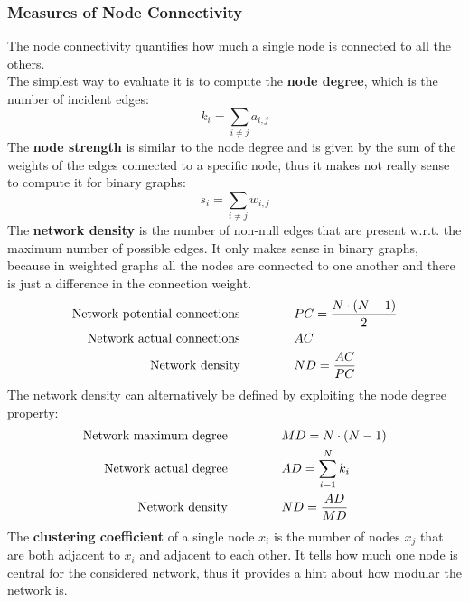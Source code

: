 \subsubsection{Measures of Node Connectivity}
The node connectivity quantifies how much a single node is connected to all the others.\\
The simplest way to evaluate it is to compute the \textbf{node degree}, which is the number of incident edges:
\begin{equation*}
    k_i=\sum_{i\neq{j}}{a_{i,j}}
\end{equation*}
The \textbf{node strength} is similar to the node degree and is given by the sum of the weights of the edges
connected to a specific node, thus it makes not really sense to compute it for binary graphs:
\begin{equation*}
    s_i=\sum_{i\neq j}w_{i,j}
\end{equation*}
The \textbf{network density} is the number of non-null edges that are present w.r.t. the maximum number of possible edges.
It only makes sense in binary graphs, because in weighted graphs all the nodes are connected to one another and
there is just a difference in the connection weight.
\begin{align*}
    \text{Network potential connections} & \hspace{1.5cm}PC=\frac{N\cdot{(N-1)}}{2}     \\
    \text{Network actual connections}    & \hspace{1.5cm}AC                             \\
    \text{Network density}               & \hspace{1.5cm}ND              =\frac{AC}{PC}
\end{align*}
The network density can alternatively be defined by exploiting the node degree property:
\begin{align*}
    \text{Network maximum degree} & \hspace{1.5cm}MD=N\cdot{(N-1)}     \\
    \text{Network actual degree}  & \hspace{1.5cm}AD=\sum_{i=1}^{N}k_i \\
    \text{Network density}        & \hspace{1.5cm}ND=\frac{AD}{MD}
\end{align*}
The \textbf{clustering coefficient} of a single node \(x_i\) is the number of nodes \(x_j\) that are both adjacent to
\(x_i\) and adjacent to each other. It tells how much one node is central for the considered network, thus it provides
a hint about how modular the network is.
